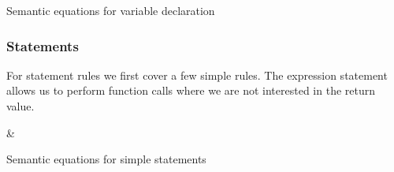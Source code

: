 \begin{table}[H]
\begin{semanticequations}
 \seSpace
\end{semanticequations}
\caption{Semantic equations for variable declaration}
\label{cstr:variabledeclaration}
\end{table}

\subsubsection{Statements}
For statement rules we first cover a few simple rules.
The expression statement allows us to perform function calls where we are not interested in the return value.

\begin{table}[H]
\begin{semanticequations}
&\semeq{\iS}{\varepsilon}{\ienvL \; \ienvF}{(\emptyset, \ienvL)} \seSpace
 \seSpace
\end{semanticequations}
\caption{Semantic equations for simple statements}
\label{cstr:statements}
\end{table}

